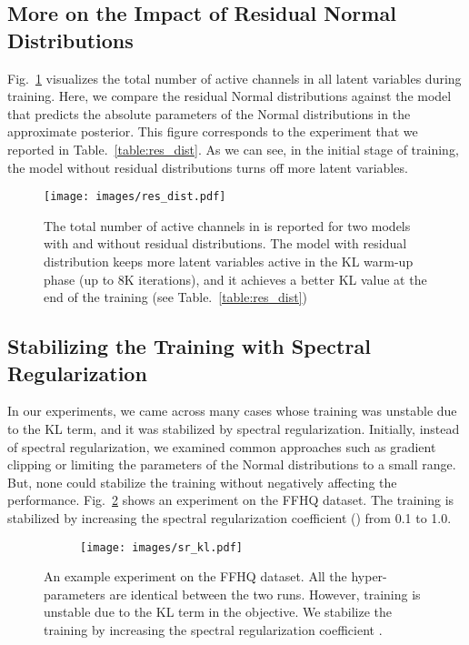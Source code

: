 \documentclass{article}
\begin{document}
\subsection{More on the Impact of Residual Normal Distributions}\label{app:res_dist}
Fig.~\ref{fig:res_dist} visualizes the total number of active channels in all latent variables during training. Here, we compare the residual Normal distributions against the model that predicts the absolute parameters of the Normal distributions in the approximate posterior. This figure corresponds to the experiment that we reported in Table.~\ref{table:res_dist}. As we can see, in the initial stage of training, the model without residual distributions turns off more latent variables. 

\begin{figure}
\centering
\texttt{[image: images/res\_dist.pdf]}
\caption{The total number of active channels in  is reported for two models with and without residual distributions. The model with residual distribution keeps more latent variables active in the KL warm-up phase (up to 8K iterations), and it achieves a better KL value at the end of the training (see Table.~\ref{table:res_dist})}
\label{fig:res_dist}
\end{figure} 
\subsection{Stabilizing the Training with Spectral Regularization}\label{app:sr_stable}
In our experiments, we came across many cases whose training was unstable due to the KL term, and it was stabilized by spectral regularization. Initially, instead of spectral regularization, we examined common approaches such as gradient clipping or limiting the parameters of the Normal distributions to a small range. But, none could stabilize the training without negatively affecting the performance. Fig.~\ref{fig:sr_stable} shows an experiment on the FFHQ dataset. The training is stabilized by increasing the spectral regularization coefficient () from 0.1 to 1.0.

\begin{figure}[!h]
\centering
\begin{subfigure}[b]{.99\textwidth}
\centering
\texttt{[image: images/sr\_kl.pdf]}
\end{subfigure} 
\caption{An example experiment on the FFHQ dataset. All the hyper-parameters are identical between the two runs. However, training is unstable due to the KL term in the objective. We stabilize the training by increasing the spectral regularization coefficient . }
\label{fig:sr_stable}
\vspace{-0.3cm}
\end{figure} 
\end{document}
